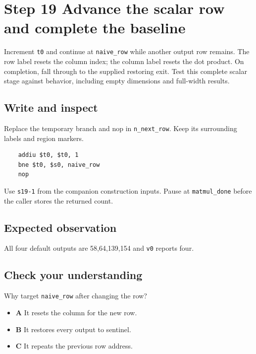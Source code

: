 \section{Step 19 Advance the scalar row and complete the baseline}\label{matmul-s19}

Increment \texttt{t0} and continue at \texttt{naive\_row} while another output row remains. The row label resets the column index; the column label resets the dot product. On completion, fall through to the supplied restoring exit. Test this complete scalar stage against behavior, including empty dimensions and full-width results.

\subsection{Write and inspect}
Replace the temporary branch and nop in \texttt{n\_next\_row}. Keep its surrounding labels and region markers.

\begin{verbatim}
    addiu $t0, $t0, 1
    bne $t0, $s0, naive_row
    nop
\end{verbatim}
Use \texttt{s19-1} from the companion construction inputs. Pause at \texttt{matmul\_done} before the caller stores the returned count.

\subsection{Expected observation}
All four default outputs are 58,64,139,154 and \texttt{v0} reports four.

\subsection{Check your understanding}
Why target \texttt{naive\_row} after changing the row?

\begin{itemize}
\item \textbf{A} It resets the column for the new row.
\item \textbf{B} It restores every output to sentinel.
\item \textbf{C} It repeats the previous row address.
\end{itemize}
